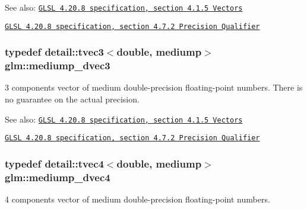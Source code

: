 \begin{Desc}
\item[See also:]\href{http://www.opengl.org/registry/doc/GLSLangSpec.4.20.8.pdf}{\tt GLSL 4.20.8 specification, section 4.1.5 Vectors} 

\href{http://www.opengl.org/registry/doc/GLSLangSpec.4.20.8.pdf}{\tt GLSL 4.20.8 specification, section 4.7.2 Precision Qualifier} \end{Desc}
\hypertarget{group__core__precision_gc051f0702cb0e717db5dd913f6261388}{
\subsubsection[mediump\_\-dvec3]{\setlength{\rightskip}{0pt plus 5cm}typedef detail::tvec3$<$double, mediump$>$ {\bf glm::mediump\_\-dvec3}}}
\label{group__core__precision_gc051f0702cb0e717db5dd913f6261388}


3 components vector of medium double-precision floating-point numbers. There is no guarantee on the actual precision.

\begin{Desc}
\item[See also:]\href{http://www.opengl.org/registry/doc/GLSLangSpec.4.20.8.pdf}{\tt GLSL 4.20.8 specification, section 4.1.5 Vectors} 

\href{http://www.opengl.org/registry/doc/GLSLangSpec.4.20.8.pdf}{\tt GLSL 4.20.8 specification, section 4.7.2 Precision Qualifier} \end{Desc}
\hypertarget{group__core__precision_gc61cf2fc2df895e5f277c978dace042a}{
\subsubsection[mediump\_\-dvec4]{\setlength{\rightskip}{0pt plus 5cm}typedef detail::tvec4$<$double, mediump$>$ {\bf glm::mediump\_\-dvec4}}}
\label{group__core__precision_gc61cf2fc2df895e5f277c978dace042a}


4 components vector of medium double-precision floating-point numbers.


